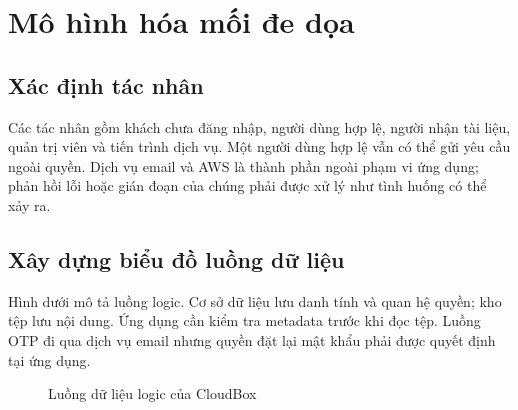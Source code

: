 \section{Mô hình hóa mối đe dọa}
\subsection{Xác định tác nhân}
Các tác nhân gồm khách chưa đăng nhập, người dùng hợp lệ, người nhận tài liệu, quản trị viên và tiến trình dịch vụ. Một người dùng hợp lệ vẫn có thể gửi yêu cầu ngoài quyền. Dịch vụ email và AWS là thành phần ngoài phạm vi ứng dụng; phản hồi lỗi hoặc gián đoạn của chúng phải được xử lý như tình huống có thể xảy ra.
\subsection{Xây dựng biểu đồ luồng dữ liệu}
Hình dưới mô tả luồng logic. Cơ sở dữ liệu lưu danh tính và quan hệ quyền; kho tệp lưu nội dung. Ứng dụng cần kiểm tra metadata trước khi đọc tệp. Luồng OTP đi qua dịch vụ email nhưng quyền đặt lại mật khẩu phải được quyết định tại ứng dụng.
\begin{figure}[htbp]
\centering
{}
\caption{Luồng dữ liệu logic của CloudBox}
\label{fig:dfd}
\end{figure}
